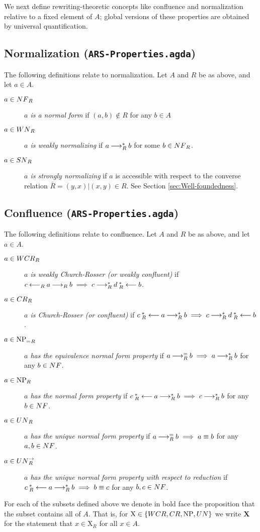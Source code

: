 We next define rewriting-theoretic concepts like confluence and normalization relative to a fixed element of $A$; global versions of these properties are obtained by universal quantification.
\subsection{Normalization (\texttt{ARS-Properties.agda})}
\begin{definition} The following definitions relate to normalization. Let $A$ and $R$ be as above, and let $a \in A$.
  \begin{description}
    \item[$a \in \NF_R$] \emph{$a$ is a normal form} if $(a,b) \notin R$ for any $b \in A$ 
    \item[$a \in \WN_R$] \emph{$a$ is weakly normalizing} if $a \mathbin{\longrightarrow_R^*} b$ for some $b \in \NF_R$.
    \item[$a \in \SN_R$] \emph{$a$ is strongly normalizing} if $a$ is accessible with respect to the converse relation $\bar{R} = {(y,x) | (x,y) \in R}$. See Section \ref{sec:Well-foundedness}. 
  \end{description}
\end{definition} 

 

\subsection{Confluence (\texttt{ARS-Properties.agda})}
\begin{definition} The following definitions relate to confluence. Let $A$ and $R$ be as above, and let $a \in A$.
    \begin{description}
        \item[$a \in \WCR_R$] \emph{$a$ is weakly Church-Rosser (or weakly confluent)} if $c \mathbin{\longleftarrow_R} a \mathbin{\longrightarrow_R} b \implies c \mathbin{\longrightarrow_R^*} d \mathbin{_R^*\longleftarrow} b$.
        \item[$a \in \CR_R$] \emph{$a$ is Church-Rosser (or confluent)} if $c \mathbin{_R^*\longleftarrow} a \mathbin{\longrightarrow_R^*} b \implies c \mathbin{\longrightarrow_R^*} d \mathbin{_R^*\longleftarrow} b$.
        \item[$a \in \mathrm{NP_=}_R$] \emph{$a$ has the equivalence normal form property} if $a \mathbin{\longrightarrow_R^=} b \implies a\mathbin{\longrightarrow_R^*} b$ for any $b \in \NF$.
        \item[$a \in \mathrm{NP}_R$] \emph{$a$ has the normal form property} if $c \mathbin{_R^*\longleftarrow} a \mathbin{\longrightarrow_R^*} b \implies c \mathbin{\longrightarrow_R^*} b$ for any $b \in \NF$. 
        \item[$a \in \UN_R$] \emph{$a$ has the unique normal form property} if $a \mathbin{\longrightarrow_R^=} b \implies a \equiv b$  for any $a, b \in \NF$.
        \item[$a \in \UNto_R$] \emph{$a$ has the unique normal form property with respect to reduction} if $c \mathbin{_R^*\longleftarrow} a \mathbin{\longrightarrow_R^*} b  \implies b \equiv c$  for any $b, c \in \NF$.
    \end{description}
\end{definition}
For each of the subsets defined above we denote in bold face the proposition that the subset contains all of $A$.
That is, for $\mathrm{X} \in \{\WCR , \CR , \NP , \UN \}$ we write $\mathbf{X}$ for the statement that $x \in \mathrm{X}_R$ for all $x \in A$.


